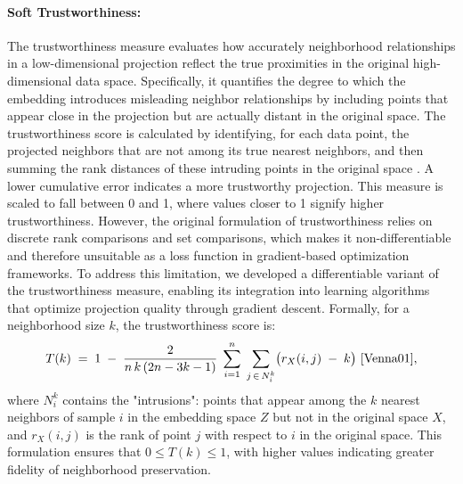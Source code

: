 \paragraph{Soft Trustworthiness:} The trustworthiness measure evaluates how accurately neighborhood relationships in a low-dimensional projection reflect the true proximities in the original high-dimensional data space. Specifically, it quantifies the degree to which the embedding introduces misleading neighbor relationships by including points that appear close in the projection but are actually distant in the original space. The trustworthiness score is calculated by identifying, for each data point, the projected neighbors that are not among its true nearest neighbors, and then summing the rank distances of these intruding points in the original space \cite{Venna01}. A lower cumulative error indicates a more trustworthy projection. This measure is scaled to fall between 0 and 1, where values closer to 1 signify higher trustworthiness. However, the original formulation of trustworthiness relies on discrete rank comparisons and set comparisons, which makes it non-differentiable and therefore unsuitable as a loss function in gradient-based optimization frameworks. To address this limitation, we developed a differentiable variant of the trustworthiness measure, enabling its integration into learning algorithms that optimize projection quality through gradient descent. Formally, for a neighborhood size $k$, the trustworthiness score is:
$$
T(k) \;=\; 1 \;-\;
\frac{2}{n\,k\,(2n-3k-1)}
\;\sum_{i=1}^{n}
\;\sum_{j \,\in\,N_i^k}
\bigl(r_X(i,j)\;-\;k\bigr) \ \cite{Venna01},
$$
where $N_i^k$ contains the "intrusions": points that appear among the $k$ nearest neighbors of sample $i$ in the embedding space $Z$ but not in the original space $X$, and $r_X(i,j)$ is the rank of point $j$ with respect to $i$ in the original space. This formulation ensures that $0 \le T(k) \le 1$, with higher values indicating greater fidelity of neighborhood preservation. 


